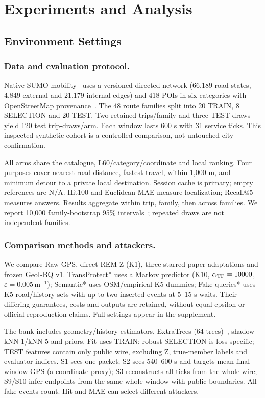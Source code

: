 \section{Experiments and Analysis}\label{sec:evaluation}
\subsection{Environment Settings}
\subsubsection{Data and evaluation protocol.}

Native SUMO mobility~\cite{sumo} uses a versioned directed network
(66,189 road states, 4,849 external and 21,179 internal edges) and
418 POIs in six categories with OpenStreetMap provenance~\cite{osm}.
The 48 route families split into 20 TRAIN, 8 SELECTION and 20 TEST.
Two retained trips/family and three TEST draws yield 120 test trip-draws/arm.
Each window lasts 600 s with 31 service ticks. This inspected synthetic cohort
is a controlled comparison, not untouched-city confirmation.

All arms share the catalogue, L60/category/coordinate and local ranking.
Four purposes cover nearest road distance, fastest travel, within 1,000 m,
and minimum detour to a private local destination.
Session cache is primary; empty references are N/A.
Hit100 and Euclidean MAE measure localization; Recall@5 measures answers.
Results aggregate within trip, family, then across families.
We report 10,000 family-bootstrap 95\% intervals~\cite{efron};
repeated draws are not independent families.

\subsubsection{Comparison methods and attackers.}
We compare Raw GPS, direct REM-Z (K1), three starred paper adaptations and
frozen GeoI-BQ v1. TransProtect* uses a Markov predictor (K10,
$\alpha_{\rm TP}=10000$, $\varepsilon=0.005\,\mathrm m^{-1}$);
Semantic* uses OSM/empirical K5 dummies; Fake queries* uses K5
road/history sets with up to two inserted events at 5--15 s waits.
Their differing guarantees, costs and outputs are retained, without equal-epsilon
or official-reproduction claims. Full settings appear in the supplement.

The bank includes geometry/history estimators, ExtraTrees
(64 trees)~\cite{extratrees}, shadow kNN-1/kNN-5 and priors.
Fit uses TRAIN; robust SELECTION is loss-specific; TEST features contain
only public wire, excluding Z, true-member labels and evaluator indices.
S1 sees one packet; S2 sees 540--600 s and targets mean final-window GPS
(a coordinate proxy); S3 reconstructs all ticks from the whole wire;
S9/S10 infer endpoints from the same whole window with public boundaries.
All fake events count. Hit and MAE can select different attackers.

